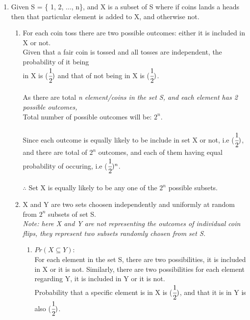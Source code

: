 \documentclass{article}
\begin{document}
\begin{enumerate}
  \newpage
  \item\textnormal{Given S = \{ 1, 2, ..., n\}, and X is a subset of S where if coins lands a heads then that particular element is added to X, and otherwise not.}\\
  \begin{enumerate}
    \item \textnormal{For each coin toss there are two possible outcomes: either it is included in X or not.}\\
    \textnormal{Given that a fair coin is tossed and all tosses are independent, the probability of it being}\\
    \textnormal{in X is ($\cfrac{1}{2})$ and that of not being in X is ($\cfrac{1}{2})$.}\\\\
    \textnormal{As there are total \it n \normalfont element/coins in the set S, and each element has 2 possible outcomes,}\\
    \textnormal{Total number of possible outcomes will be: $2^n$.}\\\\
    \textnormal{Since each outcome is equally likely to be include in set X or not, i.e ($\cfrac{1}{2})$,}
    \textnormal{and there are total of $2^n$ outcomes, and each of them having equal probability of occuring, i.e ($\cfrac{1}{2})^n$.}\\\\
    \textnormal{$\therefore$ Set X  is equally likely to be any one of the $2^n$ possible subsets.}\\
    \item \textnormal{X and Y are two sets choosen independently and uniformly at random from $2^n$ subsets of set S.}\\
    \textit{Note: here X and Y are not representing the outcomes of individual coin flips, they represent two subsets randomly chosen from set S.}\\
    \begin{enumerate}
      \item $Pr(X \subseteq Y)$:\\
      \textnormal{For each element in the set S, there are two possibilities, it is included in X or it is not.}
      \textnormal{Similarly, there are two possibilities for each element regarding Y, it is included in Y or it is not.}\\
      \textnormal{Probability that a specific element is in X is ($\cfrac{1}{2})$, and that it is in Y is also ($\cfrac{1}{2})$.}\\

\end{enumerate}
\end{enumerate}
\end{enumerate}
\end{document}
